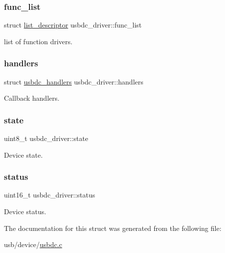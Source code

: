 \subsubsection{\texorpdfstring{func\+\_\+list}{func\_list}}
{\footnotesize\ttfamily struct \hyperlink{structlist__descriptor}{list\+\_\+descriptor} usbdc\+\_\+driver\+::func\+\_\+list}

list of function drivers. \mbox{\label{structusbdc__driver_a3a41aee4eb86d314ff44148bd70a1036}} 
\subsubsection{\texorpdfstring{handlers}{handlers}}
{\footnotesize\ttfamily struct \hyperlink{structusbdc__handlers}{usbdc\+\_\+handlers} usbdc\+\_\+driver\+::handlers}

Callback handlers. \mbox{\label{structusbdc__driver_a784023454ea918163bd42bb8ff9b418d}} 
\subsubsection{\texorpdfstring{state}{state}}
{\footnotesize\ttfamily uint8\+\_\+t usbdc\+\_\+driver\+::state}

Device state. \mbox{\label{structusbdc__driver_a790fe909a1ec4ce5c9d2df3659530c5b}} 
\subsubsection{\texorpdfstring{status}{status}}
{\footnotesize\ttfamily uint16\+\_\+t usbdc\+\_\+driver\+::status}

Device status. 

The documentation for this struct was generated from the following file\+:\begin{DoxyCompactItemize}
\item 
usb/device/\hyperlink{usbdc_8c}{usbdc.\+c}\end{DoxyCompactItemize}
